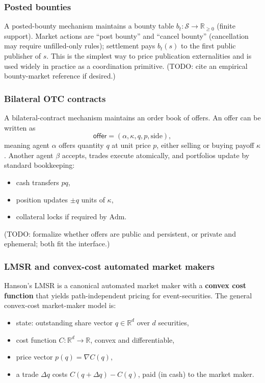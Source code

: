 \subsubsection{Posted bounties}

A posted-bounty mechanism maintains a bounty table \(b_t:\mathcal{S}\to\mathbb{R}_{\ge 0}\) (finite support). Market actions are ``post bounty'' and ``cancel bounty'' (cancellation may require unfilled-only rules); settlement pays \(b_t(s)\) to the first public publisher of \(s\). This is the simplest way to price publication externalities and is used widely in practice as a coordination primitive. (TODO: cite an empirical bounty-market reference if desired.)

\subsubsection{Bilateral OTC contracts}

A bilateral-contract mechanism maintains an order book of offers. An offer can be written as
\[
\mathsf{offer}=(\alpha,\kappa,q,p,\mathrm{side}),
\]
meaning agent \(\alpha\) offers quantity \(q\) at unit price \(p\), either selling or buying payoff \(\kappa\). Another agent \(\beta\) accepts, trades execute atomically, and portfolios update by standard bookkeeping:
\begin{itemize}
\item cash transfers \(p q\),
\item position updates \(\pm q\) units of \(\kappa\),
\item collateral locks if required by \(\mathrm{Adm}\).
\end{itemize}

(TODO: formalize whether offers are public and persistent, or private and ephemeral; both fit the interface.)

\subsubsection{LMSR and convex-cost automated market makers}

Hanson's LMSR is a canonical automated market maker with a \textbf{convex cost function} that yields path-independent pricing for event-securities. The general convex-cost market-maker model is:
\begin{itemize}
\item state: outstanding share vector \(q\in\mathbb{R}^d\) over \(d\) securities,
\item cost function \(C:\mathbb{R}^d\to\mathbb{R}\), convex and differentiable,
\item price vector \(p(q)=\nabla C(q)\),
\item a trade \(\Delta q\) costs \(C(q+\Delta q)-C(q)\), paid (in cash) to the market maker.
\end{itemize}

